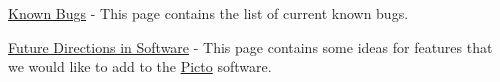 \begin{DoxyItemize}
\item \hyperlink{known_bugs}{Known Bugs} -\/ This page contains the list of current known bugs.
\item \hyperlink{future_directions_software}{Future Directions in Software} -\/ This page contains some ideas for features that we would like to add to the \hyperlink{namespace_picto}{Picto} software. 
\end{DoxyItemize}